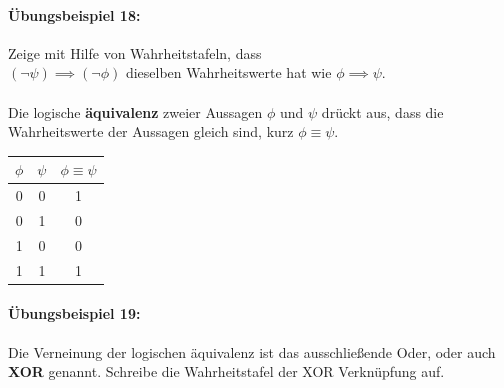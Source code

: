 \documentclass[11pt,a4paper,leqno]{report}
\numberwithin{equation}{chapter}
\begin{document}
\paragraph{\"Ubungsbeispiel 18:} Zeige mit Hilfe von Wahrheitstafeln, dass \\$(\neg\psi)\implies(\neg\phi)$ dieselben Wahrheitswerte hat wie $\phi\implies\psi$.\\
\\
Die logische \textbf{\"aquivalenz} zweier Aussagen  $\phi$ und $\psi$ dr\"uckt aus, dass die Wahrheitswerte der Aussagen gleich sind, kurz $\phi\equiv\psi$.
\begin{center}
	\begin{tabular}{|c c|c|}
		$\phi$ & $\psi$ & $\phi \equiv \psi$\\
		\hline
		0 & 0 & 1\\
		0 & 1 & 0\\
		1 & 0 & 0\\
		1 & 1 & 1\\
	\end{tabular}  
\end{center}
\paragraph{\"Ubungsbeispiel 19:} Die Verneinung der logischen \"aquivalenz ist das ausschlie\ss{}ende Oder, oder auch \textbf{XOR} genannt. Schreibe die Wahrheitstafel der XOR Verkn\"upfung auf.
\newpage
\end{document}

